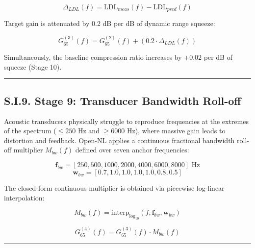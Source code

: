 \documentclass[
  12pt,
]{article}
\begin{document}
\begin{equation}
\Delta_{LDL}(f) = \text{LDL}_{meas}(f) - \text{LDL}_{pred}(f)
\end{equation}

Target gain is attenuated by 0.2 dB per dB of dynamic range squeeze:

\begin{equation}
G_{65}^{(3)}(f) = G_{65}^{(2)}(f) + \left(0.2 \cdot \Delta_{LDL}(f)\right)
\end{equation}

Simultaneously, the baseline compression ratio increases by \(+0.02\)
per dB of squeeze (Stage 10).

\begin{center}\rule{0.5\linewidth}{0.5pt}\end{center}

\subsection{S.I.9. Stage 9: Transducer Bandwidth
Roll-off}\label{s.i.9.-stage-9-transducer-bandwidth-roll-off}

Acoustic transducers physically struggle to reproduce frequencies at the
extremes of the spectrum (\(\le 250\) Hz and \(\ge 6000\) Hz), where
massive gain leads to distortion and feedback. Open-NL applies a
continuous fractional bandwidth roll-off multiplier \(M_{bw}(f)\)
defined over seven anchor frequencies:

\begin{equation}
\mathbf{f}_{bw} = [250, 500, 1000, 2000, 4000, 6000, 8000]\text{ Hz}
\end{equation} \begin{equation}
\mathbf{w}_{bw} = [0.7, 1.0, 1.0, 1.0, 1.0, 0.8, 0.5]
\end{equation}

The closed-form continuous multiplier is obtained via piecewise
log-linear interpolation:

\begin{equation}
M_{bw}(f) = \text{interp}_{\log_{10}}\left(f, \mathbf{f}_{bw}, \mathbf{w}_{bw}\right)
\end{equation}

\begin{equation}
G_{65}^{(4)}(f) = G_{65}^{(3)}(f) \cdot M_{bw}(f)
\end{equation}

\begin{center}\rule{0.5\linewidth}{0.5pt}\end{center}
\end{document}
